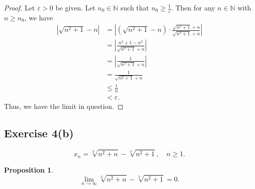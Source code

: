 \documentclass[12pt]{article}
\newtheorem{proposition}{Proposition}
\newenvironment{problem}
    {\begin{lrbox}{\mybox}\begin{minipage}{0.98\textwidth}}
    {\end{minipage}\end{lrbox}\framebox[\textwidth]{\usebox{\mybox}}}
\let\eps\varepsilon %
\newcommand{\N}{\mathbb{N}} %
\newcommand{\<}{\left\langle} %
\renewcommand{\>}{\right\rangle} %
\begin{document}
\begin{proof}
    Let $\eps>0$ be given. Let $n_0\in\N$ such that $n_0 \geq \frac1\eps$. Then for any $n\in\N$ with $n\geq n_0$, we have
    \begin{align*}
        | \sqrt{n^2+1} - n |
            &= \left|(\sqrt{n^2+1} - n) \cdot\frac{\sqrt{n^2+1} + n}{\sqrt{n^2+1} + n}\right| \\
            &= \left|\frac{n^2+1 - n^2}{\sqrt{n^2+1} + n}\right| \\
            &= \left|\frac{1}{\sqrt{n^2+1} + n}\right| \\
            &= \frac{1}{\sqrt{n^2+1} + n} \\
            &\leq \frac{1}{n} \\
            &< \eps.
    \end{align*}
    Thus, we have the limit in question.
    
\end{proof}

\newpage
\subsection*{Exercise 4(b)}
\begin{problem}
    \begin{equation}
        x_n = \sqrt[3]{n^2+n}-\sqrt[3]{n^2+1},\quad n \ge 1.
    \end{equation}
\end{problem}

\begin{proposition}
    \[\lim_{n\to\infty} \sqrt[3]{n^2+n}-\sqrt[3]{n^2+1} = 0.\]
\end{proposition}
\end{document}
